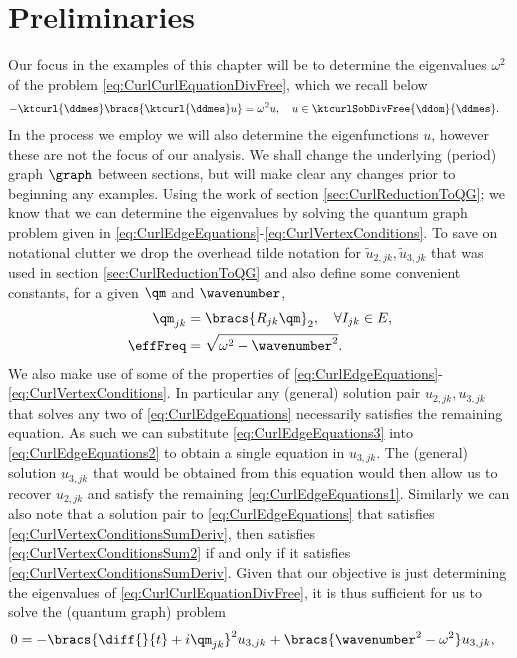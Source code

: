 \section{Preliminaries} \label{sec:ExamplePrelims}
Our focus in the examples of this chapter will be to determine the eigenvalues $\omega^2$ of the problem \eqref{eq:CurlCurlEquationDivFree}, which we recall below
\begin{align*}
	-\ktcurl{\ddmes}\bracs{\ktcurl{\ddmes}u} &= \omega^2 u, \quad u\in\ktcurlSobDivFree{\ddom}{\ddmes}.
\end{align*}
In the process we employ we will also determine the eigenfunctions $u$, however these are not the focus of our analysis.
We shall change the underlying (period) graph $\graph$ between sections, but will make clear any changes prior to beginning any examples.
Using the work of section \ref{sec:CurlReductionToQG}; we know that we can determine the eigenvalues by solving the quantum graph problem given in \eqref{eq:CurlEdgeEquations}-\eqref{eq:CurlVertexConditions}.
To save on notational clutter we drop the overhead tilde notation for $\widetilde{u}_{2,jk},\widetilde{u}_{3,jk}$ that was used in section \ref{sec:CurlReductionToQG} and also define some convenient constants, for a given $\qm$ and $\wavenumber$,
\begin{align*}
	\qm_{jk} &= \bracs{R_{jk}\qm}_2, \quad\forall I_{jk}\in E,\\
	\effFreq &= \sqrt{\omega^2 - \wavenumber^2}.
\end{align*}
We also make use of some of the properties of \eqref{eq:CurlEdgeEquations}-\eqref{eq:CurlVertexConditions}.
In particular any (general) solution pair $u_{2,jk},u_{3,jk}$ that solves any two of \eqref{eq:CurlEdgeEquations} necessarily satisfies the remaining equation.
As such we can substitute \eqref{eq:CurlEdgeEquations3} into \eqref{eq:CurlEdgeEquations2} to obtain a single equation in $u_{3,jk}$.
The (general) solution $u_{3,jk}$ that would be obtained from this equation would then allow us to recover $u_{2,jk}$ and satisfy the remaining \eqref{eq:CurlEdgeEquations1}.
Similarly we can also note that a solution pair to \eqref{eq:CurlEdgeEquations} that satisfies \eqref{eq:CurlVertexConditionsSumDeriv}, then satisfies \eqref{eq:CurlVertexConditionsSum2} if and only if it satisfies \eqref{eq:CurlVertexConditionsSumDeriv}.
Given that our objective is just determining the eigenvalues of \eqref{eq:CurlCurlEquationDivFree}, it is thus sufficient for us to solve the (quantum graph) problem
\begin{align} \label{eq:QGEquation}
	0 &= -\bracs{\diff{}{t} + i\qm_{jk}}^2 u_{3,jk} + \bracs{\wavenumber^2 - \omega^2}u_{3,jk},
\end{align}
